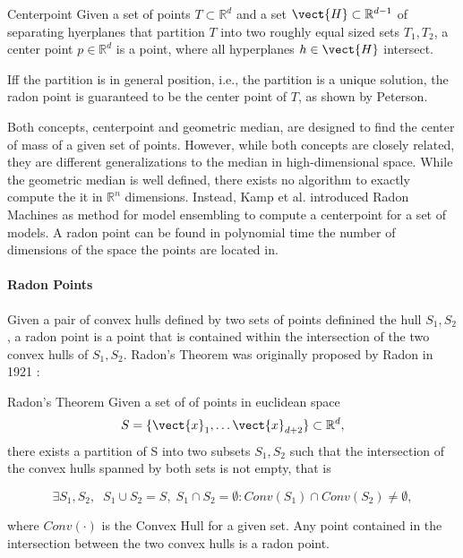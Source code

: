 \begin{definition}[parbox=false]{Centerpoint}
    Given a set of points $T \subset \mathbb{R}^{d}$ and a set  $\vect{H} \subset \mathbb{R}^{d-1}$ of separating hyerplanes that partition $T$  into two roughly equal sized sets $T_1, T_2$, a center point $p \in \mathbb{R}^d$ is a point, where all hyperplanes $h \in \vect{H}$ intersect.

    Iff the partition is in general position, i.e., the partition is a unique solution, the radon point is guaranteed to be the center point of $T$, as shown by Peterson.~\cite{peterson1972geometry}
\end{definition}

Both concepts, centerpoint and geometric median, are designed to find the center of mass of a given set of points.
However, while both concepts are closely related, they are different generalizations to the median in high-dimensional space.
While the geometric median is well defined, there exists no algorithm to exactly compute the it in $\mathbb{R}^n$ dimensions.
Instead, Kamp et al. \cite{kamp2017effective} introduced Radon Machines as method for model ensembling to compute a centerpoint for a set of models.
A radon point can be found in polynomial time \wrt the number of dimensions of the space the points are located in.
\paragraph*{Radon Points}
Given a pair of convex hulls defined by two sets of points definined the hull $S_1, S_2$, a radon point is a point that is contained within the intersection of the two convex hulls of $S_1, S_2$. 
Radon's Theorem was originally proposed by Radon in 1921 \cite{radon1921mengen}:

\begin{threm}[label=thm:radon]{Radon's Theorem}
    Given a set of of points in euclidean space
    \begin{equation}
        S = \{\vect{x}_1, \ldots \vect{x}_{d+2}\} \subset \mathbb{R}^d,
    \end{equation}
   there exists a partition of S into two subsets $S_1, S_2$ such that the intersection of the convex hulls spanned by both sets is not empty, that is
    
    \begin{equation}
        \exists S_1, S_2, \;\; S_1 \cup S_2 = S, \; S_1 \cap S_2 = \emptyset: Conv(S_1) \cap Conv(S_2) \neq \emptyset,
    \end{equation}

    where $Conv(\cdot)$ is the Convex Hull for a given set.
    Any point contained  in the intersection between the two convex hulls is a radon point.
\end{threm}

